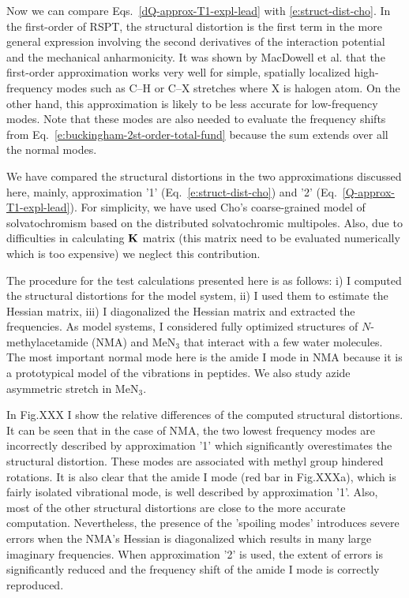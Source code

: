 \documentclass[a4paper,titlepage,twoside,fleqn,12pt]{book}
\begin{document}
\begin{refsection}
Now we can compare Eqs.~\eqref{dQ-approx-T1-expl-lead} with \eqref{e:struct-dist-cho}.
In the first\hyp{}order of RSPT, the structural distortion is the first term
in the more general expression involving the second 
derivatives of the interaction potential and the mechanical anharmonicity.
It was shown by MacDowell et al. that the first\hyp{}order approximation works 
very well for simple, spatially localized high\hyp{}frequency modes such as
C--H or C--X stretches where X is halogen atom. On the other hand, this
approximation is likely to be less accurate for low\hyp{}frequency modes.
Note that these modes are also needed to evaluate the frequency shifts
from Eq.~\eqref{e:buckingham-2st-order-total-fund} because the sum extends over
all the normal modes.

We have compared the structural distortions in the two approximations
discussed here, mainly, approximation '1' (Eq.~\eqref{e:struct-dist-cho}) and 
'2' (Eq.~\eqref{Q-approx-T1-expl-lead}). For simplicity, we have used Cho's coarse\hyp{}grained
model of solvatochromism based on the distributed solvatochromic multipoles. 
Also, due to difficulties in calculating $\bf K$ matrix (this matrix need to
be evaluated numerically which is too expensive) we neglect this contribution. 

The procedure for the test calculations presented here is as follows: i) 
I computed the structural distortions for the model system, ii) I used them to estimate
the Hessian matrix, iii) I diagonalized the Hessian matrix and extracted the frequencies.
As model systems, I considered fully optimized structures of $N$-methylacetamide (NMA) 
and MeN$_3$ 
that interact with a few water molecules.
The most important normal mode here is the amide I mode in NMA
because it is a prototypical model of the vibrations in peptides.
We also study azide asymmetric
stretch in MeN$_3$.

In Fig.XXX I show the relative differences of the computed structural distortions.
It can be seen that in the case of NMA, the two lowest frequency modes are incorrectly
described by approximation '1' which significantly overestimates the structural distortion. 
These modes are associated with methyl group hindered rotations. It is also clear that the
amide I mode (red bar in Fig.XXXa), which is fairly isolated vibrational mode, is well described by 
approximation '1'. Also, most of the other structural distortions are close to the more accurate
computation. Nevertheless, the presence of the 'spoiling modes' introduces
severe errors when the NMA's Hessian is diagonalized which results in many large imaginary 
frequencies. When approximation '2' is used, the extent of errors is significantly reduced
and the frequency shift of the amide I mode is correctly reproduced. 


\end{refsection}
\end{document}
